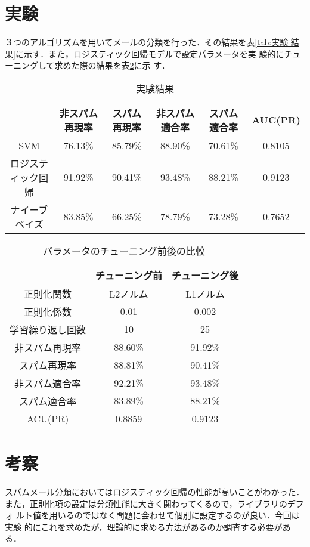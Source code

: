 \documentclass[a4paper,12pt]{jarticle}
\begin{document}
\section{実験}
３つのアルゴリズムを用いてメールの分類を行った．その結果を表\ref{tab:実験
結果}に示す．また，ロジスティック回帰モデルで設定パラメータを実
験的にチューニングして求めた際の結果を表\ref{tab:パラメータのチューニング前後の比較}に示
す．

\begin{table}[bt]
\centering
\caption{実験結果}
\label{tab:実験結果}
\fontsize{9pt}{10pt}\selectfont
\begin{tabular}{|c|c|c|c|c|c|} \hline
 &非スパム再現率&スパム再現率&非スパム適合率&スパム適合率&AUC(PR) \\ \hline
SVM& 76.13\%& 85.79\%& 88.90\%& 70.61\% & 0.8105 \\ \hline
ロジスティック回帰&91.92\% & 90.41\% & 93.48\% & 88.21\% & 0.9123 \\ \hline
ナイーブベイズ& 83.85\% & 66.25\% & 78.79\%  & 73.28\% & 0.7652  \\ \hline
\end{tabular}
\end{table}

\begin{table}[bt]
\centering
\caption{パラメータのチューニング前後の比較}
\label{tab:パラメータのチューニング前後の比較}
\fontsize{9pt}{10pt}\selectfont
\begin{tabular}{|c|c|c|} \hline
 &チューニング前&チューニング後 \\ \hline
正則化関数& L2ノルム & L1ノルム \\ \hline
正則化係数&0.01 & 0.002 \\ \hline
学習繰り返し回数  &10 & 25  \\ \hline \hline
非スパム再現率& 88.60\%& 91.92\% \\ \hline
スパム再現率& 88.81\%& 90.41\% \\ \hline
非スパム適合率& 92.21\%& 93.48\% \\ \hline
スパム適合率& 83.89\%& 88.21\% \\ \hline
ACU(PR)& 0.8859 &0.9123 \\ \hline
\end{tabular}
\end{table}


\section{考察}
スパムメール分類においてはロジスティック回帰の性能が高いことがわかった．
また，正則化項の設定は分類性能に大きく関わってくるので，ライブラリのデフォ
ルト値を用いるのではなく問題に会わせて個別に設定するのが良い．今回は実験
的にこれを求めたが，理論的に求める方法があるのか調査する必要がある．
\end{document}
